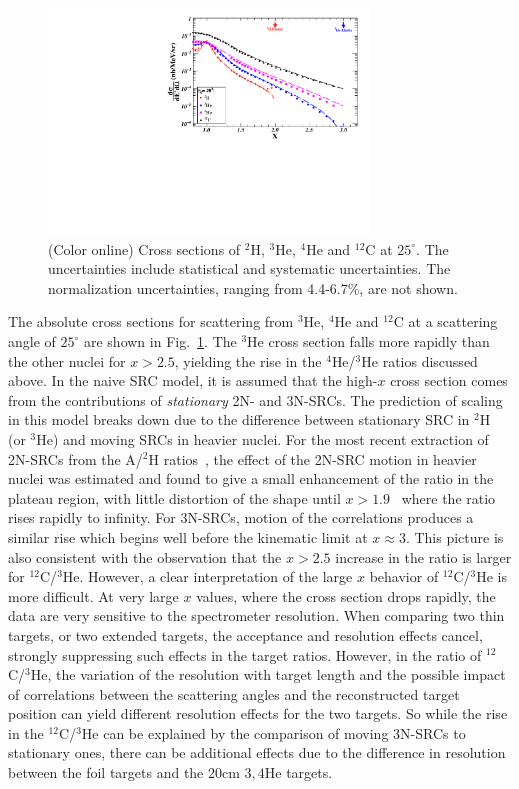 \documentclass[aps,prl,superscriptaddress,showpacs,twocolumn,floatfix,amsmath,amssymb]{revtex4-1}
\begin{document}
\begin{figure}[!ht]
    \begin{center}
        \includegraphics[width=8.5cm,angle=0]{Plot_XS_25_MC}
    \end{center}
    \vspace*{-8mm}
    \caption{(Color online) Cross sections of $^2$H, $^3$He, $^4$He and $^{12}$C at $25^{\circ}$. The uncertainties include statistical and
        systematic uncertainties. The normalization uncertainties, ranging from 4.4-6.7\%, are not shown.}
        \label{xs}
\end{figure}

The absolute cross sections for scattering from $^{3}$He, $^{4}$He and $^{12}$C at a scattering angle of
$25^{\circ}$ are shown in Fig.~\ref{xs}. The $^3$He cross section falls more rapidly than the other nuclei
for $x>2.5$, yielding the rise in the $^4$He/$^3$He ratios discussed above. In the naive SRC model, it is
assumed that the high-$x$ cross section comes from the contributions of \textit{stationary} 2N- and 3N-SRCs.
The prediction of scaling in this model breaks down due to the difference between stationary SRC in $^2$H
(or $^3$He) and moving SRCs in heavier nuclei. For the most recent extraction of 2N-SRCs from the A/$^2$H
ratios~\cite{fomin2012}, the effect of the 2N-SRC motion in heavier nuclei was estimated and found to give a
small enhancement of the ratio in the plateau region, with little distortion of the shape until $x >
1.9$~\cite{fomin2012} where the ratio rises rapidly to infinity. For 3N-SRCs, motion of the correlations
produces a similar rise which begins well before the kinematic limit at $x \approx 3$. This picture is also
consistent with the observation that the $x > 2.5$ increase in the ratio is larger for $^{12}$C/$^3$He.
However, a clear interpretation of the large $x$ behavior of $^{12}$C/$^3$He is more difficult. At very large
$x$ values, where the cross section drops rapidly, the data are very sensitive to the spectrometer resolution.
When comparing two thin targets, or two extended targets, the acceptance and resolution effects cancel, 
strongly suppressing such effects in the target ratios. However, in the ratio of $^{12}$C/$^3$He, the variation
of the resolution with target length and the possible impact of correlations between the scattering angles and
the reconstructed target position can yield different resolution effects for the two targets. So while the
rise in the $^{12}$C/$^3$He can be explained by the comparison of moving 3N-SRCs to stationary ones, there
can be additional effects due to the difference in resolution between the foil targets and the 20cm ${3,4}$He
targets.
\end{document}

